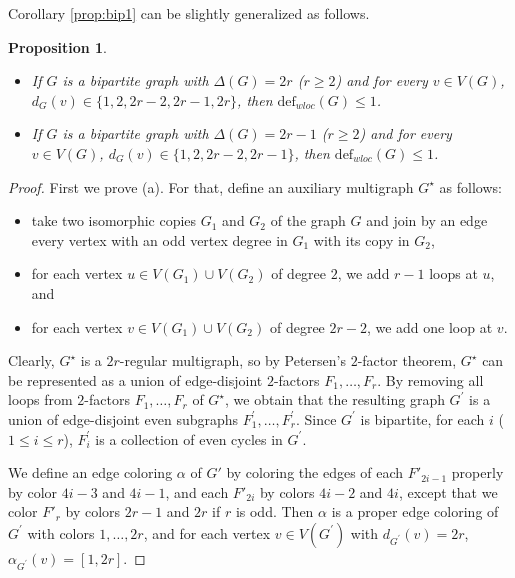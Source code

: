 \documentclass[12pt]{article}
\theoremstyle{plain}
\newtheorem{proposition}[theorem]{Proposition}
\theoremstyle{definition}
\numberwithin{equation}{section}
\begin{document}
Corollary \ref{prop:bip1} can be slightly generalized as follows.


\begin{proposition}
\label{<=2&>=D-2} 
\begin{itemize}
    \item[(a)] If $G$ is a bipartite graph with
$\Delta(G)=2r$ ($r\geq 2$) and for every $v\in V(G)$, $d_{G}(v)\in \{1,2,2r-2,2r-1,2r\}$, then $\mathrm{def}_{wloc}(G)\leq 1$.
    \item[(b)] If $G$ is a bipartite graph with
$\Delta(G)=2r-1$ ($r\geq 2$) and for every $v\in V(G)$, $d_{G}(v)\in
\{1,2,2r-2,2r-1\}$, then $\mathrm{def}_{wloc}(G)\leq 1$.
\end{itemize}
\end{proposition}

\begin{proof} 
First we prove (a). For that, define an auxiliary  multigraph $G^{\star}$ as follows:

\begin{itemize}

	\item take two isomorphic copies $G_{1}$ and $G_{2}$ of the graph $G$ and join by an edge every vertex with an odd vertex degree in
$G_{1}$ with its copy in $G_{2}$,

\item for each vertex $u \in
V(G_{1}) \cup V(G_{2})$ of degree $2$, we add $r-1$ loops at $u$,
and 

\item for each vertex $v\in V(G_{1}) \cup V(G_{2})$ of degree $2r-2$, we add one loop at $v$. 

\end{itemize}

Clearly, $G^{\star}$ is a $2r$-regular
multigraph, so by Petersen's $2$-factor theorem, $G^{\star}$ can be represented as a union of edge-disjoint $2$-factors $F_{1},\ldots,F_{r}$. By removing all loops from $2$-factors $F_{1},\ldots,F_{r}$ of $G^{\star}$, we obtain that the resulting graph $G^{\prime}$ is a union of edge-disjoint even subgraphs $F^{\prime}_{1},\ldots,F^{\prime}_{r}$. Since $G^{\prime}$ is bipartite, for each $i$ ($1\leq i\leq r$),
$F^{\prime}_{i}$ is a collection of even cycles in $G^{\prime}$.


We define an edge coloring $\alpha$ of $G'$ by coloring the edges of each $F'_{2i-1}$ properly by color $4i-3$ and $4i-1$,
and each $F'_{2i}$ by colors $4i-2$ and $4i$, except that we color $F'_r$ by colors $2r-1$ and $2r$ if $r$ is odd.
Then $\alpha$ is a proper edge coloring of $G^{\prime}$ with colors $1,\ldots,2r$, and for each vertex $v\in V(G^{\prime})$ with $d_{G^{\prime}}(v)=2r$, $\alpha_{G^{\prime}}(v)=[1,2r]$.


\end{proof}
\end{document}
